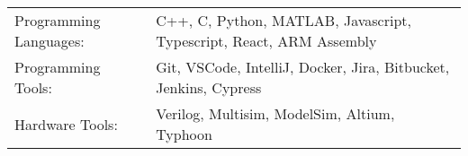 \begin{tabularx}{\linewidth}{@{}l X@{}}
Programming Languages: &  \normalsize{C++, C, Python, MATLAB, Javascript, Typescript, React, ARM Assembly}\\
Programming Tools:  &  \normalsize{Git, VSCode, IntelliJ, Docker, Jira, Bitbucket, Jenkins, Cypress}\\
Hardware Tools: & \normalsize{Verilog, Multisim, ModelSim, Altium, Typhoon} \\
\end{tabularx} \\

